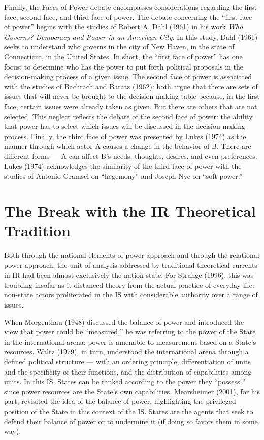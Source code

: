 Finally, the Faces of Power debate encompasses considerations regarding the first face, second face, and third face of power. The debate concerning the ``first face of power'' begins with the studies of Robert A. Dahl (1961) in his work \textit{Who Governs? Democracy and Power in an American City}. In this study, Dahl (1961) seeks to understand who governs in the city of New Haven, in the state of Connecticut, in the United States. In short, the ``first face of power'' has one focus: to determine who has the power to put forth political proposals in the decision-making process of a given issue. The second face of power is associated with the studies of Bachrach and Baratz (1962): both argue that there are sets of issues that will never be brought to the decision-making table because, in the first face, certain issues were already taken as given. But there are others that are not selected. This neglect reflects the debate of the second face of power: the ability that power has to select which issues will be discussed in the decision-making process. Finally, the third face of power was presented by Lukes (1974) as the manner through which actor A causes a change in the behavior of B. There are different forms --- A can affect B's needs, thoughts, desires, and even preferences. Lukes (1974) acknowledges the similarity of the third face of power with the studies of Antonio Gramsci on ``hegemony'' and Joseph Nye on ``soft power.''


\section{The Break with the IR Theoretical Tradition}

Both through the national elements of power approach and through the relational power approach, the unit of analysis addressed by traditional theoretical currents in IR had been almost exclusively the nation-state. For Strange (1996), this was troubling insofar as it distanced theory from the actual practice of everyday life: non-state actors proliferated in the IS with considerable authority over a range of issues.

When Morgenthau (1948) discussed the balance of power and introduced the view that power could be ``measured,'' he was referring to the power of the State in the international arena: power is amenable to measurement based on a State's resources. Waltz (1979), in turn, understood the international arena through a defined political structure --- with an ordering principle, differentiation of units and the specificity of their functions, and the distribution of capabilities among units. In this IS, States can be ranked according to the power they ``possess,'' since power resources are the State's own capabilities. Mearsheimer (2001), for his part, revisited the idea of the balance of power, highlighting the privileged position of the State in this context of the IS. States are the agents that seek to defend their balance of power or to undermine it (if doing so favors them in some way).

